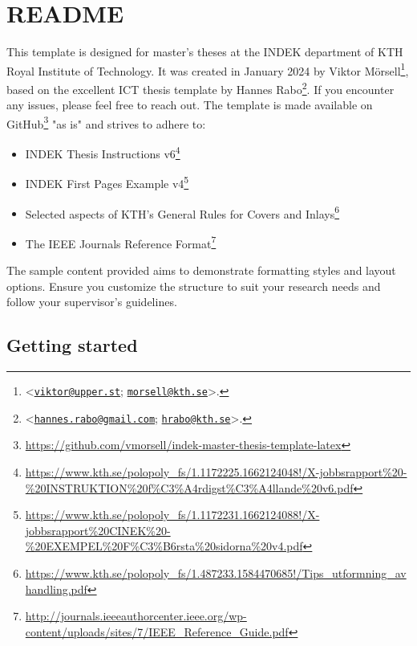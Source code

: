     
\section*{README}
\thispagestyle{empty}

\newcommand{\email}[1]{\href{mailto:#1}{\nolinkurl{#1}}}

{%
    \fontsize{12pt}{15pt}\selectfont
    This template is designed for master's theses at the INDEK department of KTH Royal Institute of Technology. It was created in January 2024 by Viktor Mörsell\footnote{<\email{viktor@upper.st}; \email{morsell@kth.se}>.}, based on the excellent ICT thesis template by Hannes Rabo\footnote{<\email{hannes.rabo@gmail.com}; \email{hrabo@kth.se}>.}. If you encounter any issues, please feel free to reach out. The template is made available on GitHub\footnote{\url{https://github.com/vmorsell/indek-master-thesis-template-latex}} "as is" and strives to adhere to:
    
    \begin{itemize}
        \item INDEK Thesis Instructions v6\footnote{\url{https://www.kth.se/polopoly_fs/1.1172225.1662124048!/X-jobbsrapport\%20-\%20INSTRUKTION\%20f\%C3\%A4rdigst\%C3\%A4llande\%20v6.pdf}}
        \item INDEK First Pages Example v4\footnote{\url{https://www.kth.se/polopoly_fs/1.1172231.1662124088!/X-jobbsrapport\%20CINEK\%20-\%20EXEMPEL\%20F\%C3\%B6rsta\%20sidorna\%20v4.pdf}}
        \item Selected aspects of KTH's General Rules for Covers and Inlays\footnote{\url{https://www.kth.se/polopoly_fs/1.487233.1584470685!/Tips_utformning_avhandling.pdf}}
        \item The IEEE Journals Reference Format\footnote{\url{http://journals.ieeeauthorcenter.ieee.org/wp-content/uploads/sites/7/IEEE_Reference_Guide.pdf}}
    \end{itemize}

    \noindent The sample content provided aims to demonstrate formatting styles and layout options. Ensure you customize the structure to suit your research needs and follow your supervisor's guidelines.

    \subsection*{Getting started}

}
